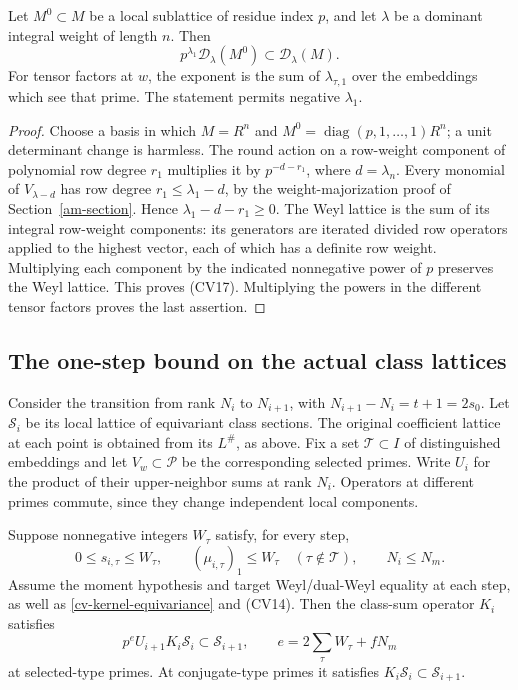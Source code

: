 \begin{lemma}\label{cv-erase-cost}
Let $M^0\subset M$ be a local sublattice of residue index $p$,
and let $\lambda$ be a dominant integral weight of length $n$.
Then
\[
                  p^{\lambda_1}\mathcal D_\lambda(M^0)
                              \subset\mathcal D_\lambda(M).
 \tag{CV17}
\]
For tensor factors at $w$, the exponent is the sum of
$\lambda_{\tau,1}$ over the embeddings which see that prime.
The statement permits negative $\lambda_1$.
\end{lemma}
\begin{proof}
Choose a basis in which $M=R^n$ and
$M^0=\operatorname{diag}(p,1,\ldots,1)R^n$; a unit determinant
change is harmless.  The round action on a row-weight component
of polynomial row degree $r_1$ multiplies it by
$p^{-d-r_1}$, where $d=\lambda_n$.
Every monomial of $V_{\lambda-d}$ has row degree
$r_1\le\lambda_1-d$, by the weight-majorization proof of
Section~\ref{am-section}.  Hence
$\lambda_1-d-r_1\ge0$.
The Weyl lattice is the sum of its integral row-weight components:
its generators are iterated divided row operators applied to the
highest vector, each of which has a definite row weight.  Multiplying
each component by the indicated nonnegative power of $p$ preserves
the Weyl lattice.  This proves (CV17).  Multiplying the powers in
the different tensor factors proves the last assertion.
\end{proof}

\subsection{The one-step bound on the actual class lattices}

Consider the transition from rank $N_i$ to $N_{i+1}$, with
$N_{i+1}-N_i=t+1=2s_0$.  Let $\mathscr S_i$ be its local lattice
of equivariant class sections.  The original coefficient lattice at
each point is obtained from its $L^\#$, as above.  Fix a set
$\mathcal T\subset I$ of distinguished embeddings and let
$V_w\subset\mathcal P$ be the corresponding selected primes.
Write $U_i$ for the product of their upper-neighbor sums at rank
$N_i$.  Operators at different primes commute, since they change
independent local components.

Suppose nonnegative integers $W_\tau$ satisfy, for every step,
\begin{equation}\label{cv-weight-bounds}
 0\le s_{i,\tau}\le W_\tau,\qquad
 (\mu_{i,\tau})_1\le W_\tau\quad(\tau\notin\mathcal T),
 \qquad N_i\le N_m.
\end{equation}
Assume the moment hypothesis and target Weyl/dual-Weyl equality
at each step, as well as \eqref{cv-kernel-equivariance} and (CV14).
Then the class-sum operator $K_i$
satisfies
\begin{equation}\label{cv-one-step}
 p^e U_{i+1}K_i\mathscr S_i\subset\mathscr S_{i+1},
 \qquad e=2\sum_\tau W_\tau+fN_m
\end{equation}
at selected-type primes.  At conjugate-type primes it satisfies
$K_i\mathscr S_i\subset\mathscr S_{i+1}$.

